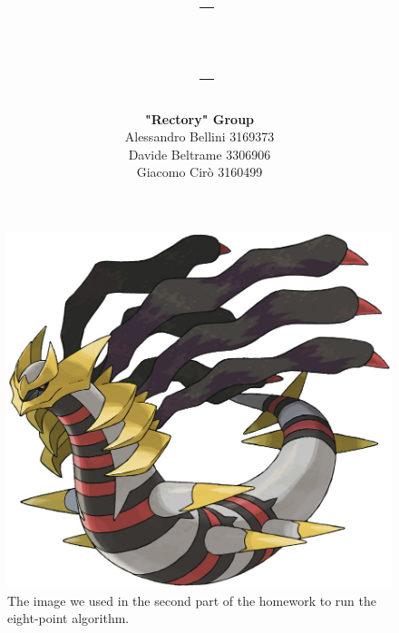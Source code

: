 \documentclass{article}
\title{
  \CourseCode \ – \CourseName \\
  \textbf{\Title} \\[2mm]
  \large \Degree \ – \University
  }
\author{\textbf{"Rectory" Group}\\[2mm]
Alessandro Bellini 3169373 \\
Davide Beltrame 3306906 \\
Giacomo Cirò 3160499
}
\date{\Semester}
\begin{document}
\pagestyle{fancy}

\maketitle

\thispagestyle{empty}

\begin{figure}[ht]
    \centering
    \includegraphics[width=0.7\linewidth]{img/giratina-origin.jpg}
    \caption{The image we used in the second part of the homework to run the eight-point algorithm.}
    \label{fig:giratina}
\end{figure}

\newpage



\newpage


\end{document}
